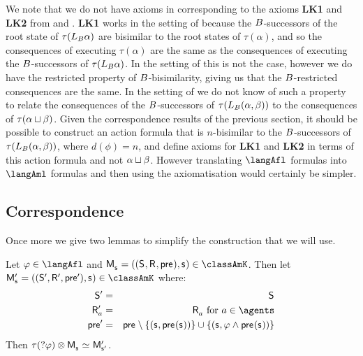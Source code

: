 We note that we do not have axioms in \logicAflS{} corresponding to the axioms {\bf LK1} and {\bf LK2} from \axiomAflK{} and \axiomAflKFF{}.
{\bf LK1} works in the setting of \classK{} because the $B$-successors of the root state of $\tau({L_{B}} \alpha)$ are bisimilar to the root states of $\tau(\alpha)$, and so the consequences of executing $\tau(\alpha)$ are the same as the consequences of executing the $B$-successors of $\tau({L_{B}} \alpha)$.
In the setting of \classKFF{} this is not the case, however we do have the restricted property of $B$-bisimilarity, giving us that the $B$-restricted consequences are the same.
In the setting of \classS{} we do not know of such a property to relate the consequences of the $B$-successors of $\tau({L_{B}} (\alpha, \beta))$ to the consequences of $\tau(\alpha \sqcup \beta)$.
Given the correspondence results of the previous section, it should be possible to construct an action formula that is $n$-bisimilar to the $B$-successors of $\tau({L_{B}} (\alpha, \beta))$, where $d(\phi) = n$, and define axioms for {\bf LK1} and {\bf LK2} in terms of this action formula and not $\alpha \sqcup \beta$.
However translating $\langAfl$ formulas into $\langAml$ formulas and then using the axiomatisation \axiomAmlS{} would certainly be simpler.

\subsection{Correspondence}

Once more we give two lemmas to simplify the construction that we will use.

\begin{lemma}\label{afl-s-construction-test}
Let $\phi \in \langAfl$ and $\aPModel{\aStateS} = \aPModelTuple{\aStateS} \in \classAmK$.
Then let $\aPModelP{\aStateS} = \aPModelTupleP{\aStateS} \in \classAmK$ where:
\begin{eqnarray*}
    \aStatesP &=& \aStates\\
    \aAccessibilityP{\agentA} &=& \aAccessibility{\agentA} \text{ for } \agentA \in \agents\\
    \aPreconditionP &=& \aPrecondition \setminus \{(\aStateS, \aPrecondition(\aStateS))\} \cup \{(\aStateS, \phi \land \aPrecondition(\aStateS))\}
\end{eqnarray*}
Then $\tau(\test{\phi}) \exec \aPModel{\aStateS} \bisimilar \aPModelP{\aStateSP}$.
\end{lemma}

